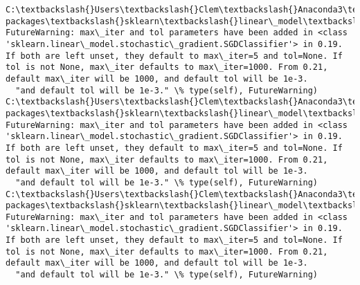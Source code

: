 \documentclass[11pt]{article}
\begin{document}
    \begin{Verbatim}[commandchars=\\\{\}]
C:\textbackslash{}Users\textbackslash{}Clem\textbackslash{}Anaconda3\textbackslash{}lib\textbackslash{}site-packages\textbackslash{}sklearn\textbackslash{}linear\_model\textbackslash{}stochastic\_gradient.py:128: FutureWarning: max\_iter and tol parameters have been added in <class 'sklearn.linear\_model.stochastic\_gradient.SGDClassifier'> in 0.19. If both are left unset, they default to max\_iter=5 and tol=None. If tol is not None, max\_iter defaults to max\_iter=1000. From 0.21, default max\_iter will be 1000, and default tol will be 1e-3.
  "and default tol will be 1e-3." \% type(self), FutureWarning)
C:\textbackslash{}Users\textbackslash{}Clem\textbackslash{}Anaconda3\textbackslash{}lib\textbackslash{}site-packages\textbackslash{}sklearn\textbackslash{}linear\_model\textbackslash{}stochastic\_gradient.py:128: FutureWarning: max\_iter and tol parameters have been added in <class 'sklearn.linear\_model.stochastic\_gradient.SGDClassifier'> in 0.19. If both are left unset, they default to max\_iter=5 and tol=None. If tol is not None, max\_iter defaults to max\_iter=1000. From 0.21, default max\_iter will be 1000, and default tol will be 1e-3.
  "and default tol will be 1e-3." \% type(self), FutureWarning)
C:\textbackslash{}Users\textbackslash{}Clem\textbackslash{}Anaconda3\textbackslash{}lib\textbackslash{}site-packages\textbackslash{}sklearn\textbackslash{}linear\_model\textbackslash{}stochastic\_gradient.py:128: FutureWarning: max\_iter and tol parameters have been added in <class 'sklearn.linear\_model.stochastic\_gradient.SGDClassifier'> in 0.19. If both are left unset, they default to max\_iter=5 and tol=None. If tol is not None, max\_iter defaults to max\_iter=1000. From 0.21, default max\_iter will be 1000, and default tol will be 1e-3.
  "and default tol will be 1e-3." \% type(self), FutureWarning)

    \end{Verbatim}
\end{document}
